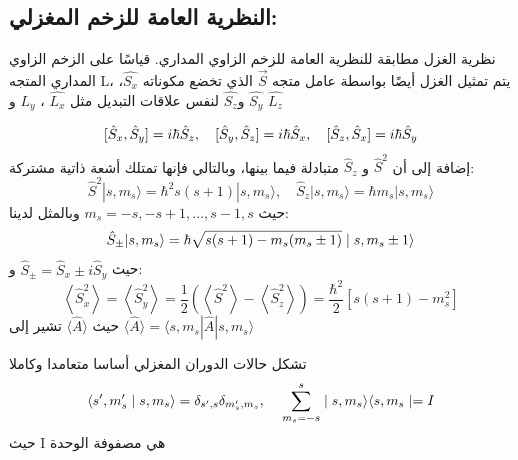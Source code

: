 \subsection{النظرية العامة للزخم المغزلي:}
نظرية الغزل مطابقة للنظرية العامة للزخم الزاوي المداري. قياسًا على الزخم الزاوي المداري المتجه L، يتم تمثيل الغزل أيضًا بواسطة عامل متجه $\vec{S}$ الذي تخضع مكوناته
 $\hat{S_{x}}$،$\hat{S_{y}}$ و$\hat{S_{z}}$  
 لنفس علاقات التبديل مثل 
$\hat{L_{x}}$ ، $\hat{L_{y}}$ و $\hat{L_{z}}$ 

\begin{equation}
	 {[\hat{S}_x, \hat{S}_y]=i \hbar \hat{S}_z, \quad[\hat{S}_y, \hat{S}_z]=i \hbar \hat{S}_x, \quad[\hat{S}_z, \hat{S}_x]=i \hbar \hat{S}_y } \\
\end{equation}
إضافة إلى أن 
$\hat{S}^2$ و $\hat{S}_z $
متبادلة فيما بينها، وبالتالي فإنها تمتلك أشعة ذاتية مشتركة:
\begin{equation}
	\hat{S}^2|s, m_s\rangle=\hbar^2 s(s+1)|s, m_s\rangle, \quad \hat{S}_z|s, m_s\rangle=\hbar m_s|s, m_s\rangle
\end{equation}
حيث 
  ${m}_{s}=-s, -s+1,..., s-1, s $ 
  وبالمثل لدينا:
\begin{equation}
	\hat{S}_{ \pm}|s, m_s\rangle=\hbar \sqrt{s(s+1)-m_s(m_s \pm 1)} \mid s, m_s \pm 1\rangle\\
\end{equation}
حيث $\hat{S}_{ \pm}=\hat{S}_x \pm i \hat{S}_y$ و:
\begin{equation}
	\left\langle\hat{S}_x^2\right\rangle=\left\langle\hat{S}_y^2\right\rangle=\frac{1}{2}\left(\left\langle\hat{S}^2\right\rangle-\left\langle\hat{S}_z^2\right\rangle\right)=\frac{\hbar^2}{2}\left[s(s+1)-m_s^2\right]
\end{equation}
حيث $\langle\hat{A}\rangle$ تشير إلى 	
$\langle\hat{A}\rangle= \langle s, m_s|\hat{A} |s, m_s\rangle$ 


تشكل حالات الدوران المغزلي أساسا متعامدا وكاملا
\begin{equation}
	\left\langle s^{\prime}, m_s^{\prime} \mid s, m_s\right\rangle=\delta_{s^{\prime}, s} \delta_{m_s^{\prime}, m_s} , \\\quad
	\sum_{m_s = -s}^s \mid s, m_s\rangle\langle s, m_s \mid=I
\end{equation}
حيث I هي مصفوفة الوحدة

